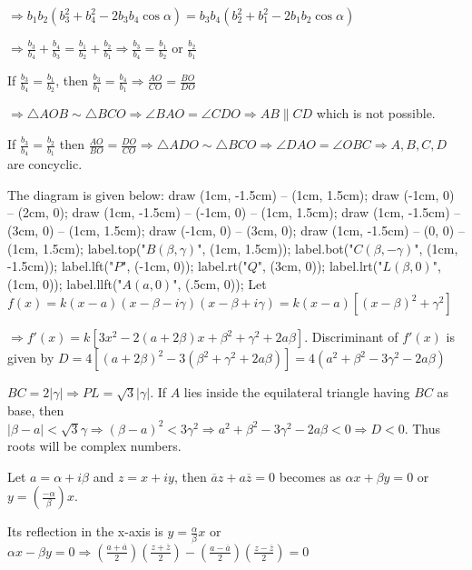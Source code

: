   $\Rightarrow b_1b_2(b_3^2 + b_4^2 - 2b_3b_4\cos\alpha) = b_3b_4(b_2^2 + b_1^2 - 2b_1b_2\cos\alpha)$

  $\Rightarrow \frac{b_3}{b_4} + \frac{b_4}{b_3} = \frac{b_1}{b_2} + \frac{b_2}{b_1}\Rightarrow
  \frac{b_3}{b_4} = \frac{b_1}{b_2}$ or $\frac{b_2}{b_1}$

  If $\frac{b_3}{b_4} = \frac{b_1}{b_2}$, then $\frac{b_3}{b_1} = \frac{b_4}{b_1} \Rightarrow \frac{AO}{CO}
  = \frac{BO}{DO}$

  $\Rightarrow \triangle AOB\sim\triangle BCO \Rightarrow \angle BAO = \angle CDO \Rightarrow AB\parallel
  CD$ which is not possible.

  If $\frac{b_3}{b_4} = \frac{b_2}{b_1}$ then $\frac{AO}{BO} = \frac{DO}{CO}\Rightarrow \triangle
  ADO\sim\triangle BCO\Rightarrow \angle DAO = \angle OBC\Rightarrow A, B, C, D$ are concyclic.
\item The diagram is given below:
  \startplacefigure[location={left, none}]
    \startMPcode
      draw (1cm, -1.5cm) -- (1cm, 1.5cm);
      draw (-1cm, 0) -- (2cm, 0);
      draw (1cm, -1.5cm) -- (-1cm, 0) -- (1cm, 1.5cm);
      draw (1cm, -1.5cm) -- (3cm, 0) -- (1cm, 1.5cm);
      draw (-1cm, 0) -- (3cm, 0);
      draw (1cm, -1.5cm) -- (0, 0) -- (1cm, 1.5cm);
      label.top("$B(\beta, \gamma)$", (1cm, 1.5cm));
      label.bot("$C(\beta, -\gamma)$", (1cm, -1.5cm));
      label.lft("$P$", (-1cm, 0));
      label.rt("$Q$", (3cm, 0));
      label.lrt("$L(\beta, 0)$", (1cm, 0));
      label.llft("$A(a, 0)$", (.5cm, 0));
    \stopMPcode
  \stopplacefigure
  Let $f(x) = k(x - a)(x - \beta - i\gamma)(x - \beta + i\gamma) = k(x - a)[(x - \beta)^2 + \gamma^2]$

  $\Rightarrow f'(x) = k[3x^2 - 2(a + 2\beta)x + \beta^2 + \gamma^2 + 2a\beta]$. Discriminant of $f'(x)$ is
  given by $D = 4[(a + 2\beta)^2 - 3(\beta^2 + \gamma^2 + 2a\beta)] = 4(a^2 + \beta^2 - 3\gamma^2 -
  2a\beta)$

  $BC = 2|\gamma| \Rightarrow PL = \sqrt{3}|\gamma|$. If $A$ lies inside the equilateral triangle having
  $BC$ as base, then $|\beta - a|< \sqrt{3}\gamma \Rightarrow (\beta - a)^2 < 3\gamma^2 \Rightarrow a^2 +
  \beta^2 - 3\gamma^2 - 2a\beta < 0 \Rightarrow D < 0$. Thus roots will be complex numbers.
\item Let $a = \alpha + i\beta$ and $z = x + iy$, then $\overline{a}z + a\overline{z} = 0$ becomes as
  $\alpha x + \beta y = 0$ or $y = \left(\frac{-\alpha}{\beta}\right)x$.

  Its reflection in the x-axis is $y = \frac{\alpha}{\beta}x$ or $\alpha x - \beta y = 0 \Rightarrow
  \left(\frac{a + \overline{a}}{2}\right)\left(\frac{z + \overline{z}}{2}\right) - \left(\frac{a -
    \overline{a}}{2}\right)\left(\frac{z -\overline{z}}{2}\right) = 0$

